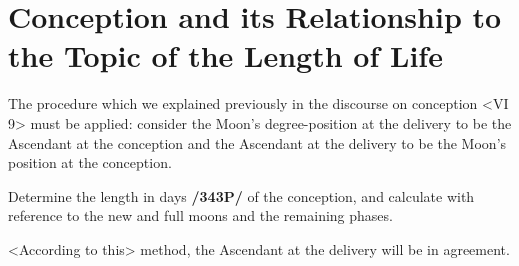 \section{Conception and its Relationship to the Topic of the Length of Life}

The procedure which we explained previously in the discourse on conception <VI 9> must be applied: consider the Moon’s degree-position at the delivery to be the Ascendant at the conception and the Ascendant at the delivery to be the Moon’s position at the conception. 

Determine the length in days \textbf{/343P/} of the conception, and calculate with reference to the new and full moons and the remaining phases. 

<According to this> method, the Ascendant at the delivery will be in agreement.

\newpage
